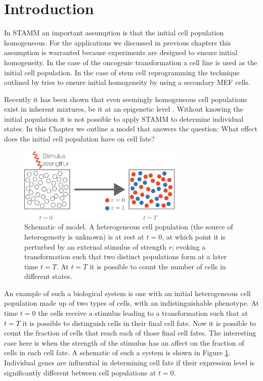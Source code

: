 \section{Introduction}
\label{sec:introduction-cell}


In STAMM an important assumption is that the initial cell population homogeneous. For the applications we discussed in previous chapters this assumption is warranted because experiments are designed to ensure initial homogeneity. In the case of the oncogenic transformation a cell line is used as the initial cell population. In the case of stem cell reprogramming the technique outlined by \cite{Hanna:2009ix} tries to ensure initial homogeneity  by using a secondary MEF cells.

Recently it has been shown that even seemingly homogeneous cell populations exist in inherent mixtures, be it at an epigenetic level \citep{Heng:2009em,Gerlinger:2012wu}. Without knowing the initial population it is not possible to apply STAMM to determine individual states. In this Chapter we outline a model that answers the question: What effect does the initial cell population have on cell fate? 


\begin{figure}[h]
  \centering
  \includegraphics[width=0.7\textwidth]{pics/cell-cycle-model.pdf}
  \caption{Schematic of model. A heterogeneous cell population (the source of heterogeneity is unknown) is at rest at $t=0$, at which point it is perturbed by an external stimulus of strength $r$; evoking a transformation such that two distinct populations form at a later time $t=T$. At $t=T$ it is possible to count the number of cells in different states. }
  \label{fig:cell-cycle-model}
\end{figure}

An example of such a biological system is one with an initial heterogeneous cell population made up of two types of cells, with an indistinguishable phenotype. At time $t=0$ the cells receive a stimulus leading to a transformation such that at $t=T$ it is possible to distinguish cells in their final cell fate. Now it is possible to count the fraction of cells that reach each of those final cell fates. The interesting case here is when the strength of the stimulus has an affect on the fraction of cells in each cell fate. A schematic of such a system is shown in Figure \ref{fig:cell-cycle-model}. Individual genes are influential in determining cell fate if their expression level is significantly different between cell populations at $t=0$. 

